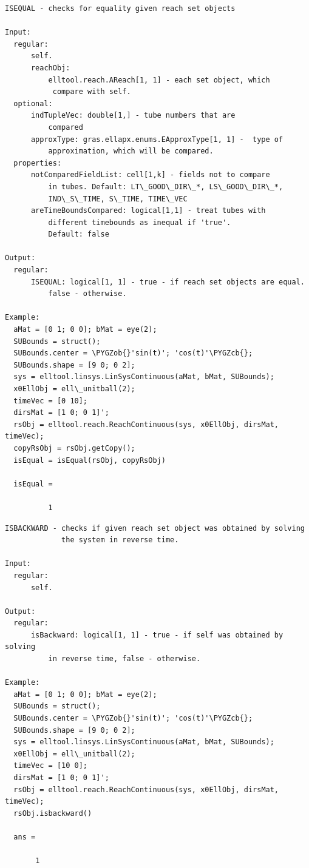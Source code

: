 \documentclass[letterpaper,10pt,english]{sphinxmanual}
\def\PYGZob{\char`\{}
\def\PYGZcb{\char`\}}
\begin{document}
\begin{Verbatim}[commandchars=\\\{\}]
ISEQUAL - checks for equality given reach set objects

Input:
  regular:
      self.
      reachObj:
          elltool.reach.AReach[1, 1] - each set object, which
           compare with self.
  optional:
      indTupleVec: double[1,] - tube numbers that are
          compared
      approxType: gras.ellapx.enums.EApproxType[1, 1] -  type of
          approximation, which will be compared.
  properties:
      notComparedFieldList: cell[1,k] - fields not to compare
          in tubes. Default: LT\_GOOD\_DIR\_*, LS\_GOOD\_DIR\_*,
          IND\_S\_TIME, S\_TIME, TIME\_VEC
      areTimeBoundsCompared: logical[1,1] - treat tubes with
          different timebounds as inequal if 'true'.
          Default: false

Output:
  regular:
      ISEQUAL: logical[1, 1] - true - if reach set objects are equal.
          false - otherwise.

Example:
  aMat = [0 1; 0 0]; bMat = eye(2);
  SUBounds = struct();
  SUBounds.center = \PYGZob{}'sin(t)'; 'cos(t)'\PYGZcb{};
  SUBounds.shape = [9 0; 0 2];
  sys = elltool.linsys.LinSysContinuous(aMat, bMat, SUBounds);
  x0EllObj = ell\_unitball(2);
  timeVec = [0 10];
  dirsMat = [1 0; 0 1]';
  rsObj = elltool.reach.ReachContinuous(sys, x0EllObj, dirsMat, timeVec);
  copyRsObj = rsObj.getCopy();
  isEqual = isEqual(rsObj, copyRsObj)

  isEqual =

          1
\end{Verbatim}

\begin{Verbatim}[commandchars=\\\{\}]
ISBACKWARD - checks if given reach set object was obtained by solving
             the system in reverse time.

Input:
  regular:
      self.

Output:
  regular:
      isBackward: logical[1, 1] - true - if self was obtained by solving
          in reverse time, false - otherwise.

Example:
  aMat = [0 1; 0 0]; bMat = eye(2);
  SUBounds = struct();
  SUBounds.center = \PYGZob{}'sin(t)'; 'cos(t)'\PYGZcb{};
  SUBounds.shape = [9 0; 0 2];
  sys = elltool.linsys.LinSysContinuous(aMat, bMat, SUBounds);
  x0EllObj = ell\_unitball(2);
  timeVec = [10 0];
  dirsMat = [1 0; 0 1]';
  rsObj = elltool.reach.ReachContinuous(sys, x0EllObj, dirsMat, timeVec);
  rsObj.isbackward()

  ans =

       1
\end{Verbatim}
\end{document}
